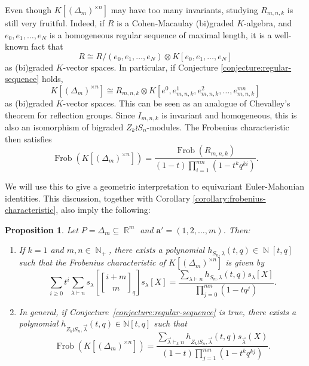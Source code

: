 \documentclass[a4paper,12pt]{amsart}
\theoremstyle{plain}
\newtheorem{proposition}[theorem]{Proposition}
\theoremstyle{definition}
\theoremstyle{remark}
\DeclareMathOperator{\NN}{\mathbb{N}}
\DeclareMathOperator{\RR}{\mathbb{R}}
\DeclareMathOperator{\Frob}{Frob}
\newcommand{\qbinom}{\genfrac{[}{]}{0pt}{}}
\begin{document}
Even though $K[(\Delta_m)^{\times n}]$ may have too many invariants, studying $R_{m, n, k}$ is still very fruitful. Indeed, if $R$ is a Cohen-Macaulay (bi)graded $K$-algebra, and $e_0, e_1, \ldots, e_N$ is a homogeneous regular sequence of maximal length, it is a well-known fact that
\[
R \cong R/(e_0, e_1, \ldots, e_N) \otimes K[e_0, e_1, \ldots, e_N] 
\]
as (bi)graded $K$-vector spaces. In particular, if Conjecture \ref{conjecture:regular-sequence} holds,
\[
K[(\Delta_m)^{\times n}] \cong R_{m, n, k} \otimes K[e^0, e_{m, n, k}^1, e_{m, n, k}^2, \dots, e_{m, n, k}^{mn}]
\]
as (bi)graded $K$-vector spaces. This can be seen as an analogue of Chevalley's theorem for reflection groups. Since $I_{m, n, k}$ is invariant and homogeneous, this is also an isomorphism of bigraded $Z_k \wr S_n$-modules. The Frobenius characteristic then satisfies
\begin{equation}\label{align:frobenius-characteristic-of-cohen-macaulay-algebra}
    \Frob(K[(\Delta_m)^{\times n}]) =\frac{\Frob(R_{m, n, k})}{(1 - t) \prod_{i = 1}^{mn} (1 - t^kq^{ki})}.
\end{equation}

We will use this to give a geometric interpretation to equivariant Euler-Mahonian identities. This discussion, together with Corollary \ref{corollary:frobenius-characteristic}, also imply the following:

\begin{proposition}\label{proposition:equivariant-euler-mahonian-non-explicit}
    Let $P = \Delta_m \subseteq \RR^m$ and $\bm{a}' = (1, 2, \ldots, m)$. Then:
\begin{enumerate}
    \item If $k = 1$ and $m, n \in \NN_+$, there exists a polynomial $h_{S_n, \lambda}(t, q) \in \NN[t, q]$ such that the Frobenius characteristic of $K[(\Delta_m)^{\times n}]$ is given by
    \[
        \sum_{i \geq 0} t^i \sum_{\lambda \vdash n} s_\lambda \left [ \qbinom{i + m}{m}_q   \right ] s_\lambda[X] = \frac{\sum_{\lambda \vdash n} h_{S_n, \lambda}(t, q) s_\lambda[X]}{\prod_{j = 0}^{mn} (1 - tq^j)}.
    \]
\item In general, if Conjecture~\ref{conjecture:regular-sequence} is true, there exists a polynomial $h_{Z_k \wr S_n, \vec{\lambda}}(t, q) \in \mathbb{N}[t, q]$ such that
    \[
        \Frob\left(K[(\Delta_m)^{\times n}]\right)= \frac{\sum_{\vec{\lambda} \vdash_k n} h_{Z_k \wr S_n, \vec{\lambda}}(t, q) s_{\vec{\lambda}}(X)}{(1 - t)\prod_{j = 1}^{mn} (1 - t^kq^{kj})}.
    \]
\end{enumerate}
\end{proposition}
\end{document}
